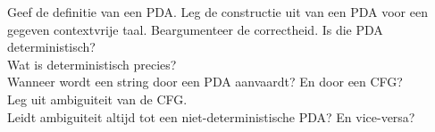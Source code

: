 \begin{question}
Geef de definitie van een PDA. Leg de constructie uit van een PDA voor een gegeven contextvrije taal. Beargumenteer de correctheid.
Is die PDA deterministisch?\\
Wat is deterministisch precies?\\
Wanneer wordt een string door een PDA aanvaardt? En door een CFG?\\
Leg uit ambiguiteit van de CFG.\\
Leidt ambiguiteit altijd tot een niet-deterministische PDA? En vice-versa?
\end{question}
